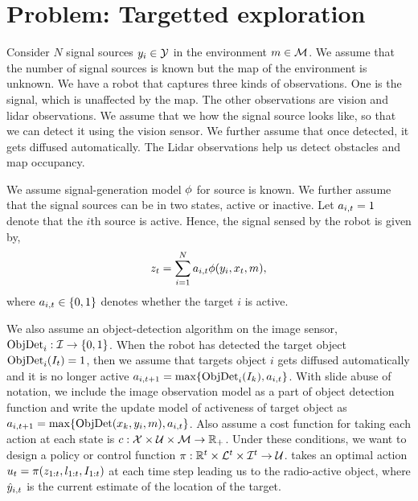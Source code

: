 \section{Problem: Targetted exploration}

Consider $N$ signal sources $y_i \in \mathcal{Y}$ in the environment $m \in
\mathcal{M}$.
We assume that the number of signal sources is known but the map of the
environment is unknown.
We have a robot that captures three kinds of observations. One is
 the signal, which is unaffected by the map.
 The other observations are vision and lidar observations.
We assume that we how the signal source looks like, so that we can
detect it using the vision sensor. We further assume that once detected, it gets
diffused automatically.
The Lidar observations help us detect obstacles and map occupancy.

We assume signal-generation model $\phi$ for source is known.
We further assume that the signal sources can be in two states, active or inactive.
Let $a_{i,t} = 1$ denote that the $i$th source is active.
Hence, the signal sensed by the robot is given by,
%
\begin{align}
z_t = \sum_{i=1}^Na_{i,t} \phi(y_i, x_t, m),
\end{align}%
% 
where $a_{i,t} \in \{0, 1\}$ denotes whether the target $i$ is
active.

We also assume an object-detection algorithm on the image sensor,
$\text{ObjDet}_i: \mathcal{I} \to \{0, 1\}$.
When the robot has detected the target object $\text{ObjDet}_i(I_t) =
1$, then we assume that targets object $i$ gets diffused automatically
and it is no longer active $a_{i,t+1} = \max\{ \text{ObjDet}_i(I_k), a_{i,t}\}$.
With slide abuse of notation, we include the image observation model as a part
of object detection function and write the update model of activeness of target
object as $a_{i,t+1} = \max\{ \text{ObjDet}(x_k, y_i, m), a_{i,t}\}$.
Also assume a cost function for taking each action at each state is $c:
\mathcal{X} \times \mathcal{U} \times \mathcal{M} \to \mathbb{R}_+$.
Under these conditions, we want to design a policy or control function $\pi:
\mathbb{R}^t \times \mathcal{L}^t \times \mathcal{I}^t  \to \mathcal{U}$.
takes an optimal action $u_t = \pi(z_{1:t}, l_{1:t}, I_{1:t})$ at
each time step leading us to the radio-active object, where $\hat{y}_{i,t}$ is the
current estimate of the location of the target.

